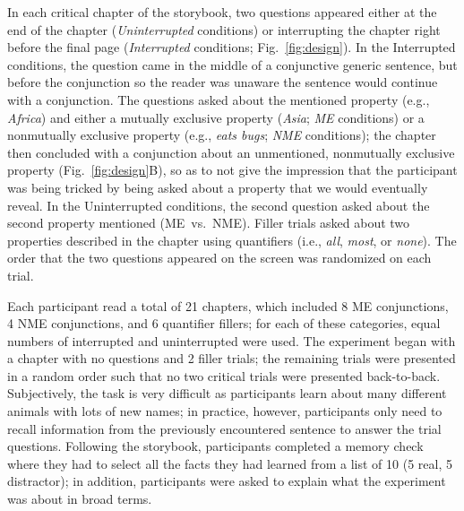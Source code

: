 \documentclass[10pt,letterpaper]{article}
\newcommand{\red}[1]{{\textcolor{Red}{#1}}}
\begin{document}
In each critical chapter of the storybook, two questions appeared either at the end of the chapter (\emph{Uninterrupted} conditions) or interrupting the chapter right before the final page  (\emph{Interrupted} conditions; Fig.~\ref{fig:design}).
In the Interrupted conditions, the question came in the middle of a conjunctive generic sentence, but before the conjunction so the reader was unaware the sentence would continue with a conjunction.
The questions asked about the mentioned property (e.g., \emph{Africa}) and either a mutually exclusive property (\emph{Asia}; \emph{ME} conditions) or a nonmutually exclusive property (e.g., \emph{eats bugs}; \emph{NME} conditions); the chapter then concluded with a conjunction about an unmentioned, nonmutually exclusive property (Fig.~\ref{fig:design}B), so as to not give the impression that the participant was being tricked by being asked about a property that we would eventually reveal.
In the Uninterrupted conditions,  the second question asked about the second property mentioned (ME~vs.~NME). 
Filler trials asked about two properties described in the chapter using quantifiers (i.e., \emph{all}, \emph{most}, or \emph{none}).
The order that the two questions appeared on the screen was randomized on each trial.

Each participant read a total of 21 chapters, which included 8 ME conjunctions, 4 NME conjunctions, and 6 quantifier fillers; for each of these categories, equal numbers of interrupted and uninterrupted were used. 
The experiment began with a chapter with no questions and 2 filler trials; the remaining trials were presented in a random order such that no two critical trials were presented back-to-back. 
Subjectively, the task is very difficult as participants learn about many different animals with lots of new names; in practice, however, participants only need to recall information from the previously encountered sentence to answer the trial questions. 
Following the storybook, participants completed a memory check where they had to select all the facts they had learned from a list of 10 (5 real, 5 distractor); in addition, participants were asked to explain what the experiment was about in broad terms.

\end{document}
